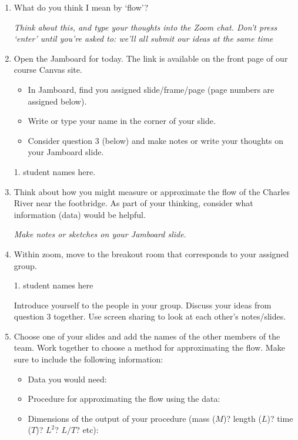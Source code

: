\documentclass[12pt,letterpaper,noanswers]{exam}
\begin{document}
\begin{enumerate}
\item What do you think I mean by `flow'?

\emph{Think about this, and type your thoughts into the Zoom chat.  Don't press `enter' until you're asked to: we'll all submit our ideas at the same time}

\item Open the Jamboard for today.  The link is available on the front page of our course Canvas site.
\begin{itemize}
\itemsep0em
    \item In Jamboard, find you assigned slide/frame/page (page numbers are assigned below).  
    \item Write or type your name in the corner of your slide.
    \item Consider question 3 (below) and make notes or write your thoughts on your Jamboard slide.
\end{itemize}

\begin{multicols}{4}
1. student names here.
\end{multicols}

\item Think about how you might measure or approximate the flow of the Charles River near the footbridge.  As part of your thinking, consider what information (data) would be helpful.

\emph{Make notes or sketches on your Jamboard slide}.



\item Within zoom, move to the breakout room that corresponds to your assigned group.

\begin{multicols}{3}
1. student names here
\end{multicols}

Introduce yourself to the people in your group.  Discuss your ideas from question 3 together.  Use screen sharing to look at each other's notes/slides.

\item Choose one of your slides and add the names of the other members of the team.  Work together to choose a method for approximating the flow.  Make sure to include the following information:

\begin{itemize}
\item Data you would need:
\item Procedure for approximating the flow using the data:
\item Dimensions of the output of your procedure (mass ($M$)? length ($L$)? time ($T$)? $L^2$? $L/T$? etc):
\end{itemize}
\end{enumerate}
\end{document}
